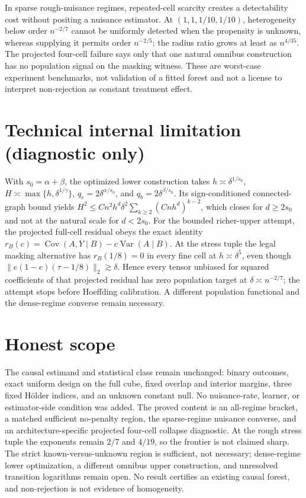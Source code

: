 \documentclass{article}
\begin{document}
In sparse rough-nuisance regimes, repeated-cell scarcity creates a detectability cost without positing a nuisance estimator.  At \((1,1,1/10,1/10)\), heterogeneity below order \(n^{-2/7}\) cannot be uniformly detected when the propensity is unknown, whereas supplying it permits order \(n^{-2/5}\); the radius ratio grows at least as \(n^{4/35}\).  The projected four-cell failure says only that one natural omnibus construction has no population signal on the masking witness.  These are worst-case experiment benchmarks, not validation of a fitted forest and not a license to interpret non-rejection as constant treatment effect.

\section*{Technical internal limitation (diagnostic only)}

With \(s_0=\alpha+\beta\), the optimized lower construction takes \(h\asymp\delta^{1/s_0}\), \(H\asymp\max\{h,\delta^{1/\gamma}\}\), \(q_e=2\delta^{\alpha/s_0}\), and \(q_b=2\delta^{\beta/s_0}\).  Its sign-conditioned connected-graph bound yields \(H^2\le Cn^2h^d\delta^2\sum_{k\ge2}(Cnh^d)^{k-2}\), which closes for \(d\ge2s_0\) and not at the natural scale for \(d<2s_0\).  For the bounded richer-upper attempt, the projected full-cell residual obeys the exact identity \(r_B(c)=\operatorname{Cov}(A,Y\mid B)-c\operatorname{Var}(A\mid B)\).  At the stress tuple the legal masking alternative has \(r_B(1/8)=0\) in every fine cell at \(h\asymp\delta^5\), even though \(\|e(1-e)(\tau-1/8)\|_2\gtrsim\delta\).  Hence every tensor unbiased for squared coefficients of that projected residual has zero population target at \(\delta\asymp n^{-2/7}\); the attempt stops before Hoeffding calibration.  A different population functional and the dense-regime converse remain necessary.

\section{Honest scope}

The causal estimand and statistical class remain unchanged: binary outcomes, exact uniform design on the full cube, fixed overlap and interior margins, three fixed Hölder indices, and an unknown constant null.  No nuisance-rate, learner, or estimator-side condition was added.  The proved content is an all-regime bracket, a matched sufficient no-penalty region, the sparse-regime nuisance converse, and an architecture-specific projected four-cell collapse diagnostic.  At the rough stress tuple the exponents remain \(2/7\) and \(4/19\), so the frontier is not claimed sharp.  The strict known-versus-unknown region is sufficient, not necessary; dense-regime lower optimization, a different omnibus upper construction, and unresolved transition logarithms remain open.  No result certifies an existing causal forest, and non-rejection is not evidence of homogeneity.
\end{document}
